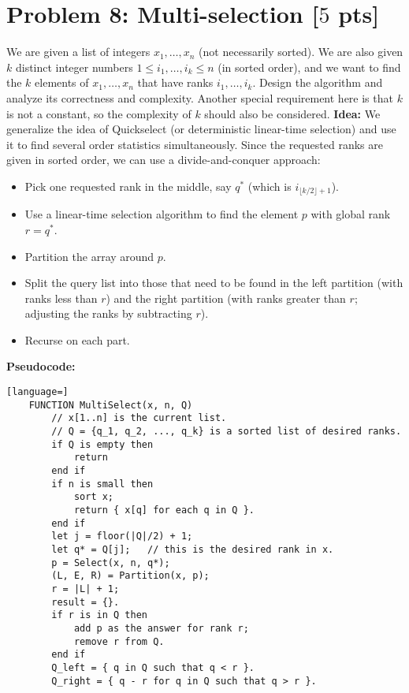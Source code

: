 \documentclass[letterpaper, 11pt]{article}
\newcommand{\1}{\mathds{1}}	%
\theoremstyle{definition}
\newcommand{\problem}[1]{\section*{Problem #1}}
\newenvironment{solution}{{\par\noindent\it Solution.}}{}
\begin{document}
\problem{8: Multi-selection [$5$ pts]}
We are given a list of integers $x_1, \ldots, x_n$ (not necessarily sorted). We are also given $k$ distinct integer numbers $1\leq i_1, \ldots, i_k \leq n$ (in sorted order), and we want to find the $k$ elements of $x_1, \ldots, x_n$ that have ranks $i_1, \ldots, i_k$. Design the algorithm and analyze its correctness and complexity. Another special requirement here is that $k$ is not a constant, so the complexity of $k$ should also be considered.
\begin{solution}
    \textbf{Idea:}  
    We generalize the idea of Quickselect (or deterministic linear-time selection) and use it to find several order statistics simultaneously. Since the requested ranks are given in sorted order, we can use a divide-and-conquer approach:
    \begin{itemize}
        \item Pick one requested rank in the middle, say \(q^*\) (which is \(i_{\lfloor k/2\rfloor+1}\)).
        \item Use a linear-time selection algorithm to find the element \(p\) with global rank \(r=q^*\).
        \item Partition the array around \(p\).
        \item Split the query list into those that need to be found in the left partition (with ranks less than \(r\)) and the right partition (with ranks greater than \(r\); adjusting the ranks by subtracting \(r\)).
        \item Recurse on each part.
    \end{itemize}
    
    \bigskip
    \textbf{Pseudocode:}
    
    \begin{lstlisting}[language=]
    FUNCTION MultiSelect(x, n, Q)
        // x[1..n] is the current list.
        // Q = {q_1, q_2, ..., q_k} is a sorted list of desired ranks.
        if Q is empty then
            return 
        end if
        if n is small then
            sort x; 
            return { x[q] for each q in Q }.
        end if
        let j = floor(|Q|/2) + 1;
        let q* = Q[j];   // this is the desired rank in x.
        p = Select(x, n, q*);
        (L, E, R) = Partition(x, p);
        r = |L| + 1;
        result = {}.
        if r is in Q then
            add p as the answer for rank r;
            remove r from Q.
        end if
        Q_left = { q in Q such that q < r }.
        Q_right = { q - r for q in Q such that q > r }.
        

\end{lstlisting}
\end{solution}
\end{document}
